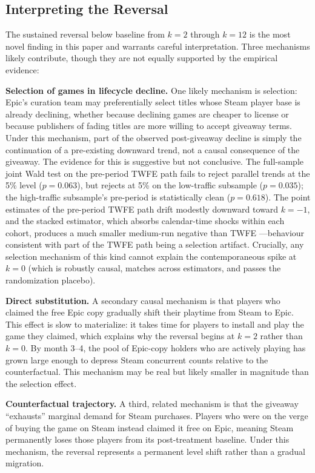 \documentclass[11pt]{article}
\begin{document}
\subsection{Interpreting the Reversal}

The sustained reversal below baseline from $k = 2$ through $k = 12$ is the most novel
finding in this paper and warrants careful interpretation. Three mechanisms likely
contribute, though they are not equally supported by the empirical evidence:

\textbf{Selection of games in lifecycle decline.} One likely mechanism is selection:
Epic's curation team may preferentially select titles whose Steam player base is
already declining, whether because declining games are cheaper to license or
because publishers of fading titles are more willing to accept giveaway terms.
Under this mechanism, part of the observed post-giveaway decline is simply the
continuation of a pre-existing downward trend, not a causal consequence of the
giveaway. The evidence for this is suggestive but not conclusive. The full-sample
joint Wald test on the pre-period TWFE path fails to reject parallel trends at
the 5\% level ($p = 0.063$), but rejects at 5\% on the low-traffic subsample
($p = 0.035$); the high-traffic subsample's pre-period is statistically clean
($p = 0.618$). The point estimates of the pre-period TWFE path drift modestly
downward toward $k = -1$, and the stacked estimator, which absorbs calendar-time
shocks within each cohort, produces a much smaller medium-run negative than TWFE
---behaviour consistent with part of the TWFE path being a selection artifact.
Crucially, any selection mechanism of this kind cannot explain the
contemporaneous spike at $k = 0$ (which is robustly causal, matches across
estimators, and passes the randomization placebo).

\textbf{Direct substitution.} A secondary causal mechanism is that players who
claimed the free Epic copy gradually shift their playtime from Steam to Epic. This
effect is slow to materialize: it takes time for players to install and play the
game they claimed, which explains why the reversal begins at $k = 2$ rather than
$k = 0$. By month 3--4, the pool of Epic-copy holders who are actively playing has
grown large enough to depress Steam concurrent counts relative to the counterfactual.
This mechanism may be real but likely smaller in magnitude than the selection effect.

\textbf{Counterfactual trajectory.} A third, related mechanism is that the giveaway
``exhausts'' marginal demand for Steam purchases. Players who were on the verge of
buying the game on Steam instead claimed it free on Epic, meaning Steam permanently
loses those players from its post-treatment baseline. Under this mechanism, the
reversal represents a permanent level shift rather than a gradual migration.
\end{document}
